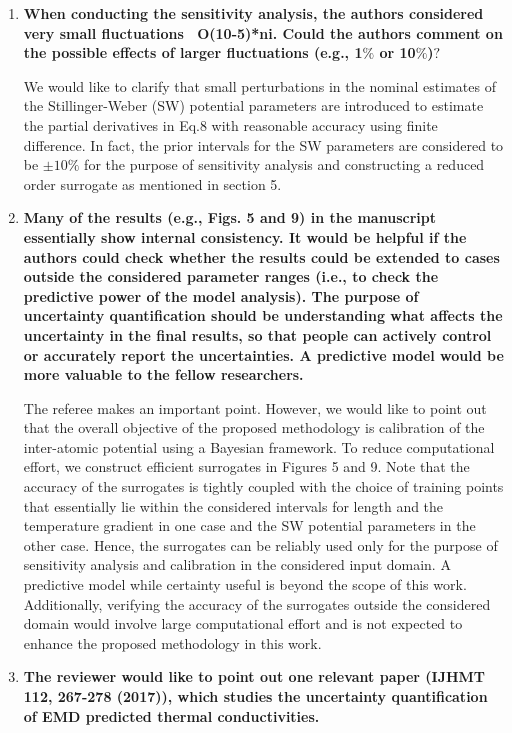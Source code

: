 \documentclass[12pt]{article}
\begin{document}
\begin{enumerate}[leftmargin=*,itemsep=24pt]
\item \textbf{When conducting the sensitivity analysis, the authors considered very small fluctuations ~O(10-5)*ni. Could the authors comment on the possible effects of larger fluctuations (e.g., 1$\%$ or 10$\%$)$?$}

We would like to clarify that small perturbations in the nominal estimates of the Stillinger-Weber (SW)
potential parameters are introduced to estimate the partial derivatives in Eq.8 with reasonable accuracy using
finite difference. In fact, the prior intervals for the SW parameters are considered to be $\pm 10\%$ for the
purpose of sensitivity analysis and constructing a reduced order surrogate as mentioned in section 5. 

\item \textbf{Many of the results (e.g., Figs. 5 and 9) in the manuscript essentially show internal consistency. It would be helpful if the authors could check whether the results could be extended to cases outside the considered parameter ranges (i.e., to check the predictive power of the model analysis). The purpose of uncertainty quantification should be understanding what affects the uncertainty in the final results, so that people can actively control or accurately report the uncertainties. A predictive model would be more valuable to the fellow researchers.}

The referee makes an important point. However, we would like to point out that the overall objective of the
proposed methodology is calibration of the inter-atomic potential using a Bayesian framework. To
reduce computational effort, we construct efficient surrogates in Figures 5 and 9. Note that the accuracy
of the surrogates is tightly coupled with the choice of training points that essentially lie within the
considered intervals for length and the temperature gradient in one case and the SW potential parameters
in the other case. Hence, the surrogates can be reliably used only for the purpose of sensitivity analysis
and calibration in the considered input domain. A predictive model while certainty useful is beyond the
scope of this work. Additionally, verifying the accuracy of the surrogates outside the considered domain 
would involve large computational effort and is not expected to enhance the proposed methodology in this work. 

\item \textbf{The reviewer would like to point out one relevant paper (IJHMT 112, 267-278 (2017)), which studies the uncertainty quantification of EMD predicted thermal conductivities.}


\end{enumerate}
\end{document}
